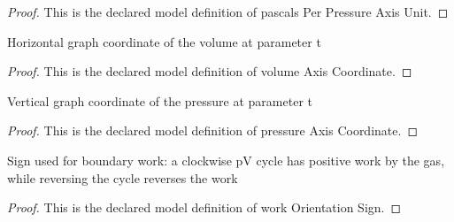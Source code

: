 \begin{proof}
  This is the declared model definition of pascals Per Pressure Axis Unit.
\end{proof}
\begin{definition}
  \label{def:physics:phyx-mini-0357:phyxminiproblems-problemphyxmini0357-volumeaxiscoordinate}
  Horizontal graph coordinate of the volume at parameter t
\end{definition}
\begin{proof}
  This is the declared model definition of volume Axis Coordinate.
\end{proof}
\begin{definition}
  \label{def:physics:phyx-mini-0357:phyxminiproblems-problemphyxmini0357-pressureaxiscoordinate}
  Vertical graph coordinate of the pressure at parameter t
\end{definition}
\begin{proof}
  This is the declared model definition of pressure Axis Coordinate.
\end{proof}
\begin{definition}
  \label{def:physics:phyx-mini-0357:phyxminiproblems-problemphyxmini0357-workorientationsign}
  Sign used for boundary work: a clockwise pV cycle has positive work by the gas, while reversing the cycle reverses the work
\end{definition}
\begin{proof}
  This is the declared model definition of work Orientation Sign.
\end{proof}
